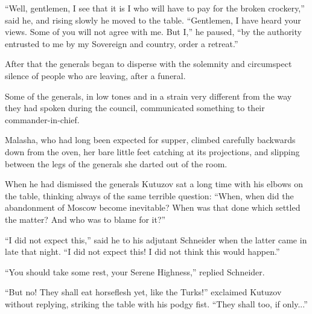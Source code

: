 ``Well, gentlemen, I see that it is I who will have to pay for
the broken crockery,'' said he, and rising slowly he moved to the
table. ``Gentlemen, I have heard your views. Some of you will not
agree with me. But I,'' he paused, ``by the authority entrusted
to me by my Sovereign and country, order a retreat.''

After that the generals began to disperse with the solemnity and
circumspect silence of people who are leaving, after a funeral.

Some of the generals, in low tones and in a strain very different
from the way they had spoken during the council, communicated
something to their commander-in-chief.

Malasha, who had long been expected for supper, climbed carefully
backwards down from the oven, her bare little feet catching at
its projections, and slipping between the legs of the generals
she darted out of the room.

When he had dismissed the generals Kutuzov sat a long time with
his elbows on the table, thinking always of the same terrible
question: ``When, when did the abandonment of Moscow become
inevitable? When was that done which settled the matter? And who
was to blame for it?''

``I did not expect this,'' said he to his adjutant Schneider when
the latter came in late that night. ``I did not expect this! I
did not think this would happen.''

``You should take some rest, your Serene Highness,'' replied
Schneider.

``But no! They shall eat horseflesh yet, like the Turks!''
exclaimed Kutuzov without replying, striking the table with his
podgy fist. ``They shall too, if only...''


